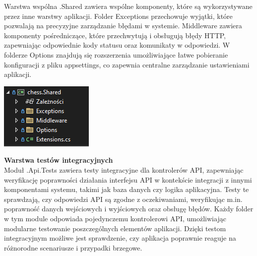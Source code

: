 \documentclass[12pt,a4paper]{article}
\begin{document}
\begin{minipage}[t]{0.45\textwidth}
    \vspace{0pt}
    \raggedright
    Warstwa wspólna .Shared zawiera wspólne komponenty, które są wykorzystywane przez inne warstwy aplikacji. Folder Exceptions przechowuje wyjątki, które pozwalają na precyzyjne zarządzanie błędami w systemie. Middleware zawiera komponenty pośredniczące, które przechwytują i obsługują błędy HTTP, zapewniając odpowiednie kody statusu oraz komunikaty w odpowiedzi. W folderze Options znajdują się rozszerzenia umożliwiające łatwe pobieranie konfiguracji z pliku appsettings, co zapewnia centralne zarządzanie ustawieniami aplikacji.
\end{minipage}
\hfill
\begin{minipage}[t]{0.45\textwidth}
    \vspace{0pt}
    \centering
    \includegraphics[width=\linewidth]{zdj/struktura_back_shared.png} 
\end{minipage}
\vspace{0.5cm}

\textbf{Warstwa testów integracyjnych}\\
Moduł .Api.Tests zawiera testy integracyjne dla kontrolerów API, zapewniając weryfikację poprawności działania interfejsu API w kontekście integracji z innymi komponentami systemu, takimi jak baza danych czy logika aplikacyjna. Testy te sprawdzają, czy odpowiedzi API są zgodne z oczekiwaniami, weryfikując m.in. poprawność danych wejściowych i wyjściowych oraz obsługę błędów. Każdy folder w tym module odpowiada pojedynczemu kontrolerowi API, umożliwiając modularne testowanie poszczególnych elementów aplikacji. Dzięki testom integracyjnym możliwe jest sprawdzenie, czy aplikacja poprawnie reaguje na różnorodne scenariusze i przypadki brzegowe.
\end{document}
